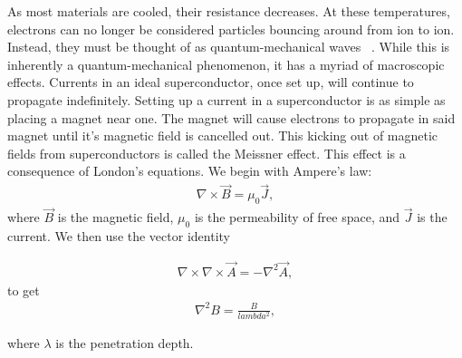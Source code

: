 As most materials are cooled, their resistance decreases. At these temperatures, electrons can no longer be considered particles bouncing around from ion to ion. Instead, they must be thought of as quantum-mechanical waves ~\cite{Miszczak15}. While this is inherently a quantum-mechanical phenomenon, it has a myriad of macroscopic effects. Currents in an ideal superconductor, once set up, will continue to propagate indefinitely. Setting up a current in a superconductor is as simple as placing a magnet near one. The magnet will cause electrons to propagate in said magnet until it's magnetic field is cancelled out. This kicking out of magnetic fields from superconductors is called the Meissner effect. This effect is a consequence of London's equations. We begin with Ampere's law:
\begin{eqnarray}
\nabla \times \overrightarrow B  = \mu_0 \overrightarrow J,
\label{Ampere}
\end{eqnarray}
where $\overrightarrow B$ is the magnetic field, $\mu_0$ is the permeability of free space, and $\overrightarrow J$ is the current. We then use the vector identity 

\begin{eqnarray}
\nabla \times \nabla \times \overrightarrow A  = -\nabla^2 \overrightarrow A,
\label{stokes}
\end{eqnarray}
to get 
\begin{eqnarray}
\nabla^2 B = \frac{B}{lambda^2},
\label{penetration}
\end{eqnarray}

where $\lambda$ is the penetration depth. 

